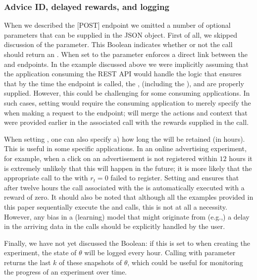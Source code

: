 \documentclass[nojss]{jss}
\begin{document}
\subsubsection{Advice ID, delayed rewards, and logging}
\label{sec:advice-id}

When we described the [POST]  endpoint we omitted a number of optional parameters that can be supplied in the JSON object. First of all, we skipped discussion of the  parameter. This Boolean indicates whether or not the  call should return an . When set to  the  parameter enforces a direct link between the  and  endpoints. In the example discussed above we were implicitly assuming that the application consuming the REST API would handle the logic that ensures that by the time the  endpoint is called, the ,  (including the ), and  are properly supplied. However, this could be challenging for some consuming applications. In such cases, setting  would require the consuming application to merely specify the  when making a request to the  endpoint;  will merge the actions and context that were provided earlier in the associated  call with the rewards supplied in the  call.

When setting , one can also specify a) how  long the  will be retained (in hours). This is useful in some specific applications. In an online advertising experiment, for example, when a click on an advertisement is not registered within $12$ hours it is extremely unlikely that this will happen in the future; it is more likely that the appropriate call to the  with $r_t = 0$ failed to register. Setting  and  ensures that after twelve hours the  call associated with the  is automatically executed with a reward of zero. It should also be noted that although all the examples provided in this paper sequentially execute the  and  calls, this is not at all a necessity. However, any bias in a (learning) model that might originate from (e.g.,) a delay in the arriving data in the  calls should be explicitly handled by the user.

Finally, we have not yet discussed the  Boolean: if this is set to  when creating the experiment, the state of $\theta$ will be logged every hour. Calling  with parameter  returns the last $k$ of these snapshots of $\theta$, which could be useful for monitoring the progress of an experiment over time.
\end{document}
